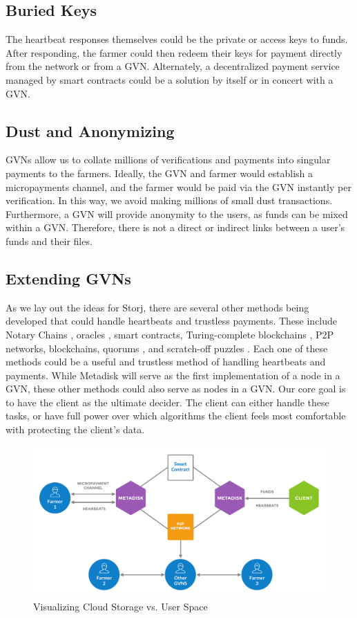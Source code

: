 \documentclass[a4paper,10pt]{article}
\begin{document}
\subsection{Buried Keys}
The heartbeat responses themselves could be the private or access keys to funds. After responding, the farmer could then redeem their keys for payment directly from the network or from a GVN. Alternately, a decentralized payment service managed by smart contracts could be a solution by itself or in concert with a GVN. 

\subsection{Dust and Anonymizing}
GVNs allow us to collate millions of verifications and payments into singular payments to the farmers. Ideally, the GVN and farmer would establish a micropayments channel, and the farmer would be paid via the GVN instantly per verification. In this way, we avoid making millions of small dust transactions. Furthermore, a GVN will provide anonymity to the users, as funds can be mixed within a GVN. Therefore, there is not a direct or indirect links between a user’s funds and their files.

\subsection{Extending GVNs}
As we lay out the ideas for Storj, there are several other methods being developed that could handle heartbeats and trustless payments. These include Notary Chains \cite{7}, oracles \cite{21}, smart contracts, Turing-complete blockchains \cite{22}, P2P networks, blockchains, quorums \cite{20}, and scratch-off puzzles \cite{23}. Each one of these methods could be a useful and trustless method of handling heartbeats and payments. While Metadisk \cite{1} will serve as the first implementation of a node in a GVN, these other methods could also serve as nodes in a GVN. Our core goal is to have the client as the ultimate decider. The client can either handle these tasks, or have full power over which algorithms the client feels most comfortable with protecting the client’s data. 

\begin{figure}[h!]
\centering
\includegraphics[width=\linewidth]{10}
\caption{Visualizing Cloud Storage vs. User Space }
\end{figure}
\end{document}
